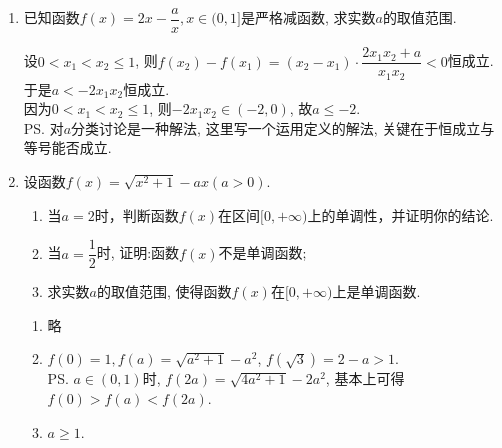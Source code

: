 \begin{enumerate}
\item 已知函数$f(x)=2x-\dfrac{a}{x}, x\in(0,1]$是严格减函数, 求实数$a$的取值范围. 
\begin{jieda}
设$0<x_1<x_2\leq 1$, 则$f(x_2)-f(x_1)=(x_2-x_1)\cdot\dfrac{2x_1x_2+a}{x_1x_2}<0$恒成立. \\
于是$a<-2x_1x_2$恒成立. \\
因为$0<x_1<x_2\leq 1$, 则$-2x_1x_2\in(-2,0)$, 故$a\leq -2$. \\
\ps 对$a$分类讨论是一种解法, 这里写一个运用定义的解法, 关键在于恒成立与等号能否成立. 
\end{jieda}
\begin{vspace_}
   \vsp[3] 
\end{vspace_}


\item 设函数$f(x)=\sqrt{x^2+1}-ax(a>0)$. 
\begin{enumerate}[(1)]
\item 当$a=2$时，判断函数$f(x)$在区间$[0,+\infty)$上的单调性，并证明你的结论.
\item 当$a=\dfrac{1}{2}$时, 证明:函数$f(x)$不是单调函数; 
\item 求实数$a$的取值范围, 使得函数$f(x)$在$[0,+\infty)$上是单调函数. 
\end{enumerate}
\begin{jieda}
\begin{enumerate}[(1)]
\item 略
\item $f(0)=1,f(a)=\sqrt{a^2+1}-a^2$, $f(\sqrt{3})=2-a>1$. \\
\ps $a\in(0,1)$时, $f(2a)=\sqrt{4a^2+1}-2a^2$, 基本上可得$f(0)>f(a)<f(2a)$. 
\item $a\geq 1$. 
\end{enumerate}
\end{jieda}
\begin{vspace_}
   \vsp[4] 
\end{vspace_}


\end{enumerate}
